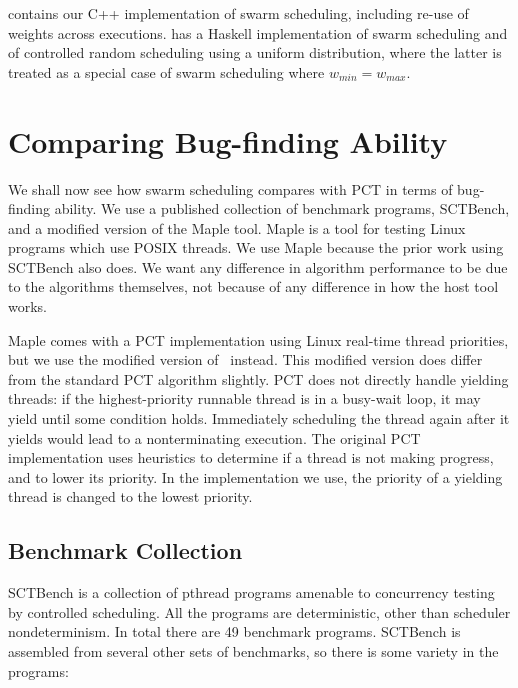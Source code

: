  contains our C++ implementation of swarm scheduling,
including re-use of weights across executions.  \dejafu{} has a
Haskell implementation of swarm scheduling and of controlled random
scheduling using a uniform distribution, where the latter is treated
as a special case of swarm scheduling where $w_{min} = w_{max}$.

\section{Comparing Bug-finding Ability}
\label{sec:algorithms-bench}

We shall now see how swarm scheduling compares with PCT in terms of
bug-finding ability.  We use a published collection of benchmark
programs, SCTBench\cite{thomson2016,thomson2014}, and a modified
version of the Maple tool\cite{yu2012}.  Maple is a tool for testing
Linux programs which use POSIX threads\cite{ieee1995}.  We use Maple
because the prior work using SCTBench also does.  We want any
difference in algorithm performance to be due to the algorithms
themselves, not because of any difference in how the host tool works.

Maple comes with a PCT implementation using Linux real-time thread priorities,
but we use the modified version of~\cite{thomson2016} instead.  This modified
version does differ from the standard PCT algorithm slightly.  PCT does not
directly handle yielding threads: if the highest-priority runnable thread is in
a busy-wait loop, it may yield until some condition holds.  Immediately
scheduling the thread again after it yields would lead to a nonterminating
execution.  The original PCT implementation uses heuristics to determine if a
thread is not making progress, and to lower its priority\cite{burckhardt2010}.
In the implementation we use, the priority of a yielding thread is changed to
the lowest priority\cite{thomson2016}.

\subsection{Benchmark Collection}
\label{sec:algorithms-bench-sctbench}

SCTBench\cite{thomson2016,thomson2014} is a collection of pthread
programs amenable to concurrency testing by controlled scheduling.
All the programs are deterministic, other than scheduler
nondeterminism.  In total there are 49 benchmark programs.  SCTBench
is assembled from several other sets of benchmarks, so there is some
variety in the programs:

